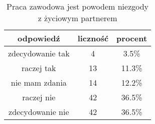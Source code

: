 \begin{table}[H]
\caption{Praca zawodowa jest powodem niezgody z życiowym partnerem}
\centering
\begin{tabular}{ | c | c | c |}
\hline
odpowiedź & liczność & procent\\
\hline
zdecydowanie tak  &  4  & 3.5\% \\
\hline
raczej tak  &  13  & 11.3\% \\
\hline
nie mam zdania  &  14  & 12.2\% \\
\hline
raczej nie  &  42  & 36.5\% \\
\hline
zdecydowanie nie  &  42  & 36.5\% \\
\hline
\end{tabular}
\label{tab:Q28}
\end{table}

